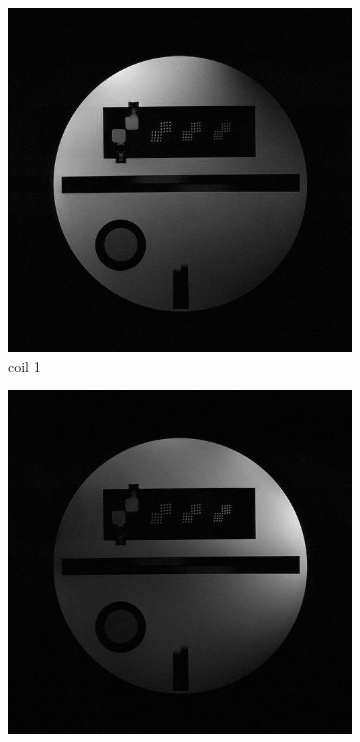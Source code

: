 \documentclass[UTF8]{article}
\begin{document}
\begin{figure}[ht]
\begin{subfigure}[t]{0.15\textwidth}
		\includegraphics[width=\textwidth]{./image/1coil.jpg}
		\caption{coil 1 }
		\label{fig:1b}
	\end{subfigure}
	\begin{subfigure}[t]{0.15\textwidth}
		\centering
		\includegraphics[width=\textwidth]{./image/2coil.jpg}

\end{subfigure}
\end{figure}
\end{document}
